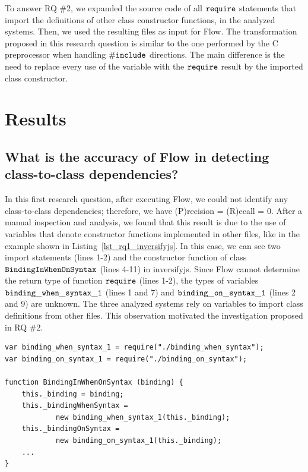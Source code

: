 \documentclass[review]{elsarticle}
\newcommand{\mcode}[1]{$\tt #1$}
\begin{document}
To answer RQ \#2, we expanded the source code of all \mcode{require} statements that import the definitions of other class constructor functions, in the analyzed systems. Then, we used the resulting files as input for Flow. The transformation proposed in this research question is similar to the one performed by the C preprocessor when handling \mcode{\#include} directions. The main difference is the need to replace every use of the variable with the \mcode{require} result by the imported class constructor.


\section{Results}
\label{sec:results}

\subsection{What is the accuracy of Flow in detecting class-to-class dependencies?}
\label{sec:rq1}

In this first research question, after executing Flow, we could not identify any class-to-class dependencies; therefore, we have (P)recision = (R)ecall = 0. After a manual inspection and analysis, we found that this result is due to the use of variables that denote constructor functions implemented in other files, like in the example shown in Listing~\ref{lst_rq1_inversifyjs}. In this case, we can see two import statements (lines 1-2) and the constructor function of class \mcode{BindingInWhenOnSyntax} (lines 4-11) in {\sc inversifyjs}. Since Flow cannot determine the return type of function \mcode{require} (lines 1-2), the types of variables \mcode{binding\_when\_syntax\_1} (lines 1 and 7) and \mcode{binding\_on\_syntax\_1} (lines 2 and 9) are unknown. The three analyzed systems rely on variables to import class definitions from other files. This observation motivated the investigation proposed in RQ \#2.


\begin{lstlisting}[caption=JavaScript code using variables denoting constructor functions in {\sc inversifyjs}, label=lst_rq1_inversifyjs, emph={[2]binding_when_syntax_1, binding_on_syntax_1},emphstyle={[2]\ttfamily\bfseries\color{darkgreen}}]
var binding_when_syntax_1 = require("./binding_when_syntax");
var binding_on_syntax_1 = require("./binding_on_syntax");

function BindingInWhenOnSyntax (binding) {
	this._binding = binding;
	this._bindingWhenSyntax = 
			new binding_when_syntax_1(this._binding);
	this._bindingOnSyntax = 
			new binding_on_syntax_1(this._binding);
	...
}
\end{lstlisting} 
\end{document}
